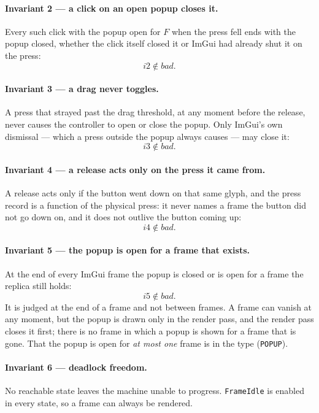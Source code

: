\documentclass[a4paper,10pt,fleqn]{article}
\begin{document}
\paragraph{Invariant 2 --- a click on an open popup closes it.}
Every such click with the popup open for $F$ when the press fell ends with the
popup closed, whether the click itself closed it or ImGui had already shut it on
the press:
\[
  i2 \notin bad.
\]

\paragraph{Invariant 3 --- a drag never toggles.}
A press that strayed past the drag threshold, at any moment before the release,
never causes the controller to open or close the popup.  Only ImGui's own
dismissal --- which a press outside the popup always causes --- may close it:
\[
  i3 \notin bad.
\]

\paragraph{Invariant 4 --- a release acts only on the press it came from.}
A release acts only if the button went down on that same glyph, and the press
record is a function of the physical press: it never names a frame the button
did not go down on, and it does not outlive the button coming up:
\[
  i4 \notin bad.
\]

\paragraph{Invariant 5 --- the popup is open for a frame that exists.}
At the end of every ImGui frame the popup is closed or is open for a frame the
replica still holds:
\[
  i5 \notin bad.
\]
It is judged at the end of a frame and not between frames.  A frame can vanish
at any moment, but the popup is drawn only in the render pass, and the render
pass closes it first; there is no frame in which a popup is shown for a frame
that is gone.  That the popup is open for \emph{at most one} frame is in the
type (\texttt{POPUP}).

\paragraph{Invariant 6 --- deadlock freedom.}
No reachable state leaves the machine unable to progress.  \texttt{FrameIdle}
is enabled in every state, so a frame can always be rendered.
\end{document}
